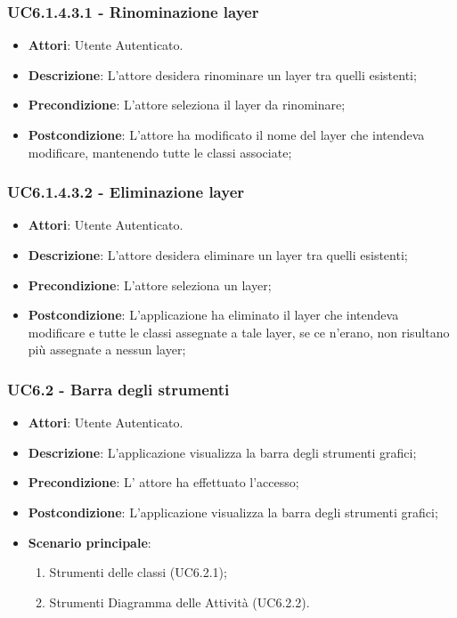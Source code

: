 \subsubsection{UC6.1.4.3.1 - Rinominazione layer} 
\label{sssec:UC6.1.4.3.1} 
\begin{itemize} 
\item \textbf{Attori}: Utente Autenticato.
\item \textbf{Descrizione}: L'attore desidera rinominare un layer tra quelli esistenti;
\item \textbf{Precondizione}: L'attore seleziona il layer da rinominare;
\item \textbf{Postcondizione}: L'attore ha modificato il nome del layer che intendeva modificare, mantenendo tutte le classi associate;
\end{itemize} 
\subsubsection{UC6.1.4.3.2 - Eliminazione layer} 
\label{sssec:UC6.1.4.3.2} 
\begin{itemize} 
\item \textbf{Attori}: Utente Autenticato.
\item \textbf{Descrizione}: L'attore desidera eliminare un layer tra quelli esistenti;
\item \textbf{Precondizione}: L'attore seleziona un layer;
\item \textbf{Postcondizione}: L'applicazione ha eliminato il layer che intendeva modificare e tutte le classi assegnate a tale layer, se ce n'erano, non risultano più assegnate a nessun layer;
\end{itemize} 
\subsubsection{UC6.2 - Barra degli strumenti} 
\label{sssec:UC6.2} 
\begin{itemize} 
\item \textbf{Attori}: Utente Autenticato.
\item \textbf{Descrizione}: L'applicazione visualizza la barra degli strumenti grafici;
\item \textbf{Precondizione}: L' attore ha effettuato l'accesso;
\item \textbf{Postcondizione}: L'applicazione visualizza la barra degli strumenti grafici;
\item \textbf{Scenario principale}: \begin{enumerate}\item Strumenti delle classi (UC6.2.1);\item Strumenti Diagramma delle Attività (UC6.2.2). 
 \end{enumerate}
\end{itemize} 
